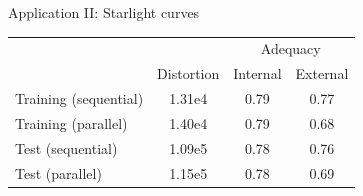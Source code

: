 \begin{frame}{Application II: Starlight curves}
\begin{footnotesize}
\vspace*{-0.3cm}
\begin{table}[H]
\centering
\begin{tabular}{lccc}                           \hline
 &            & \multicolumn{2}{c}{Adequacy} \\
 & Distortion & Internal & External          \\ \hline
Training (sequential) & 1.31e4 & 0.79 & 0.77 \\
Training (parallel)   & 1.40e4 & 0.79 & 0.68 \\
Test (sequential)     & 1.09e5 & 0.78 & 0.76 \\
Test (parallel)       & 1.15e5 & 0.78 & 0.69 \\ \hline
\end{tabular}
\end{table}
\end{footnotesize}

\end{frame}

